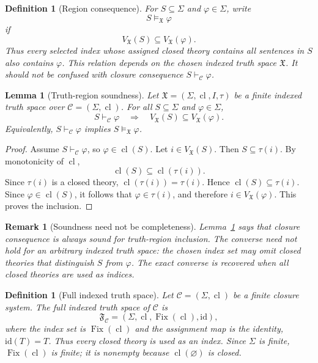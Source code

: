 \documentclass[10pt,a4paper]{amsart}
\numberwithin{equation}{section}
\newtheorem{lemma}[theorem]{Lemma}
\newtheorem{definition}[theorem]{Definition}
\newtheorem{remark}[theorem]{Remark}
\newcommand{\Cl}{\operatorname{cl}}
\newcommand{\Fix}{\operatorname{Fix}}
\newcommand{\C}{\mathcal C}
\newcommand{\X}{\mathfrak X}
\newcommand{\F}{\mathfrak F}
\newcommand{\Sig}{\Sigma}
\begin{document}
\begin{definition}[Region consequence]
For \(S\subseteq\Sig\) and \(\varphi\in\Sig\), write
\[
  S\models_{\X}\varphi
\]
if
\[
  V_{\X}(S)\subseteq V_{\X}(\varphi).
\]
Thus every selected index whose assigned closed theory contains all sentences in \(S\) also contains \(\varphi\). This relation depends on the chosen indexed truth space \(\X\). It should not be confused with closure consequence \(S\vdash_{\C}\varphi\).
\end{definition}

\begin{lemma}[Truth-region soundness]
\label{lem:truth-region-soundness}
Let \(\X=(\Sig,\Cl,I,\tau)\) be a finite indexed truth space over \(\C=(\Sig,\Cl)\). For all \(S\subseteq\Sig\) and \(\varphi\in\Sig\),
\[
  S\vdash_{\C}\varphi
  \quad\Longrightarrow\quad
  V_{\X}(S)\subseteq V_{\X}(\varphi).
\]
Equivalently, \(S\vdash_{\C}\varphi\) implies \(S\models_{\X}\varphi\).
\end{lemma}

\begin{proof}
Assume \(S\vdash_{\C}\varphi\), so \(\varphi\in\Cl(S)\). Let \(i\in V_{\X}(S)\). Then \(S\subseteq\tau(i)\). By monotonicity of \(\Cl\),
\[
  \Cl(S)\subseteq\Cl(\tau(i)).
\]
Since \(\tau(i)\) is a closed theory, \(\Cl(\tau(i))=\tau(i)\). Hence \(\Cl(S)\subseteq\tau(i)\). Since \(\varphi\in\Cl(S)\), it follows that \(\varphi\in\tau(i)\), and therefore \(i\in V_{\X}(\varphi)\). This proves the inclusion.
\end{proof}

\begin{remark}[Soundness need not be completeness]
Lemma~\ref{lem:truth-region-soundness} says that closure consequence is always sound for truth-region inclusion. The converse need not hold for an arbitrary indexed truth space: the chosen index set may omit closed theories that distinguish \(S\) from \(\varphi\). The exact converse is recovered when all closed theories are used as indices.
\end{remark}

\begin{definition}[Full indexed truth space]
Let \(\C=(\Sig,\Cl)\) be a finite closure system. The \emph{full indexed truth space} of \(\C\) is
\[
  \F_{\C}=(\Sig,\Cl,\Fix(\Cl),\mathrm{id}),
\]
where the index set is \(\Fix(\Cl)\) and the assignment map is the identity, \(\mathrm{id}(T)=T\). Thus every closed theory is used as an index. Since \(\Sig\) is finite, \(\Fix(\Cl)\) is finite; it is nonempty because \(\Cl(\varnothing)\) is closed.
\end{definition}
\end{document}
